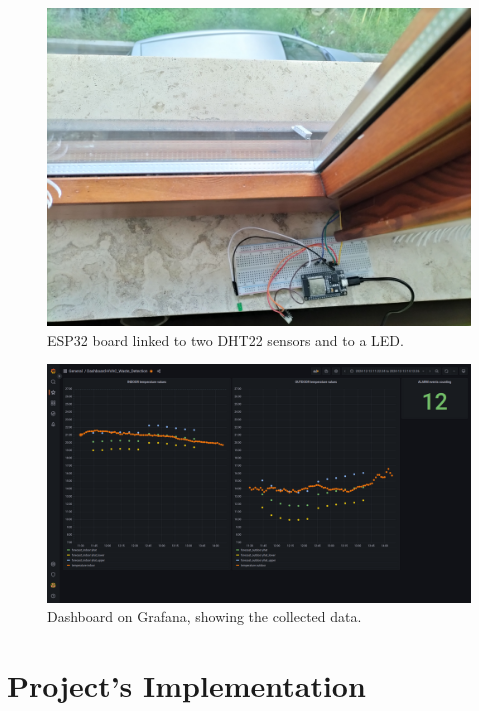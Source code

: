 \documentclass[conference]{IEEEtran}
\begin{document}
\begin{figure}[htbp]
    \centerline{\includegraphics[scale=0.06]{figures/figure_esp.jpg}}
    \caption{ESP32 board linked to two DHT22 sensors and to a LED.}
    \label{fig_esp}
\end{figure}

\begin{figure}[htbp]
    \centerline{\includegraphics[scale=0.125]{figures/figure_grafana.png}}
    \caption{Dashboard on Grafana, showing the collected data.}
    \label{fig_grafana}
\end{figure}


\section{Project’s Implementation}
\end{document}
